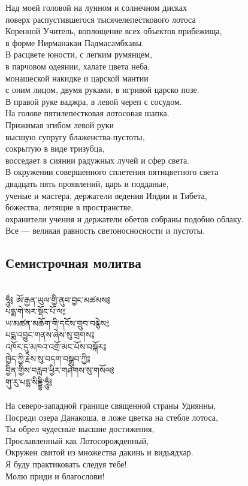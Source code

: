 Над моей головой на лунном и солнечном дисках \\
поверх распустившегося тысячелепесткового лотоса\\
Коренной Учитель, воплощение всех объектов прибежища,\\
в форме Нирманакаи Падмасамбхавы.\\
В расцвете юности, с легким румянцем,\\
в парчовом одеянии, халате цвета неба, \\
монашеской накидке и царской мантии\\
с оним лицом, двумя руками, в игривой царско позе.\\
В правой руке ваджра, в левой череп с сосудом.\\
На голове пятилепестковая лотосовая шапка.\\
Прижимая згибом левой руки \\
высшую супругу блаженства-пустоты,\\
сокрытую в виде тризубца,\\
восседает в сиянии радужных лучей и сфер света.\\
В окружении совершенного сплетения пятицветного света\\
двадцать пять проявлений, царь и подданые,\\
ученые и мастера, держатели ведения Индии и Тибета, \\
божества, летящие в пространстве, \\
охранители учения и держатели обетов собраны подобно облаку.\\
Все — великая равность светоносносности и пустоты.
\newpage
\subsection{Семистрочная молитва}
\\
\ti
ཧཱུྂ༔ ཨོ་རྒྱན་ཡུལ་གྱི་ནུབ་བྱང་མཚམས༔\\
པདྨ་གེ་སར་སྡོང་པོ་ལ༔\\
ཡ་མཚན་མཆོག་གི་དངོས་གྲུབ་བརྙེས༔\\
པདྨ་འབྱུང་གནས་ཞེས་སུ་གྲགས༔\\
འཁོར་དུ་མཁའ་འགྲོ་མང་པོས་བསྐོར༔\\
ཁྱེད་ཀྱི་རྗེས་སུ་བདག་བསྒྲུབ་ཀྱི༔\\
བྱིན་གྱིས་བརླབ་ཕྱིར་གཤེགས་སུ་གསོལ༔\\
གུ་རུ་པདྨ་སིདྡྷི་ཧཱུྂ༔\\
\\
\ru
На северо-западной границе священной страны Удиянны,\\
Посреди озера Данакоша, в ложе цветка на стебле лотоса,\\
Ты обрел чудесные высшие достижения,\\
Прославленный как Лотосорожденный,\\
Окружен свитой из множества дакинь и видьядхар.\\
Я буду практиковать следуя тебе!\\
Молю приди и благослови!
\newpage
